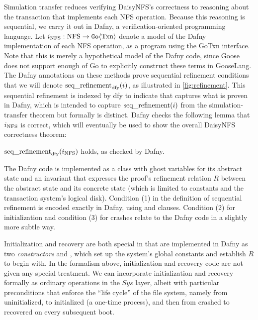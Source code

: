 \newlength{\stepw}
\newlength{\dstepw}
\newlength{\nfstop}

Simulation transfer reduces verifying DaisyNFS's correctness to reasoning about
the transaction that implements each NFS operation. Because this reasoning is
sequential, we carry it out in Dafny, a verification-oriented programming language.
Let $i_{\mathrm{NFS}} : \mathrm{NFS} \to \mathtt{Go}\langle \mathrm{Txn} \rangle$ denote a model of the
Dafny implementation of each NFS operation, as a program using the GoTxn
interface. Note that this is merely a hypothetical model of the Dafny code,
since Goose does not support enough of Go to explicitly construct these terms in
GooseLang. The Dafny annotations on these methods prove sequential refinement
conditions that we will denote $\operatorname{seq\_refinement}_{\mathrm{dfy}}(i)$, as
illustrated in \cref{fig:refinement}. This sequential refinement is indexed by
dfy to indicate that captures what is proven in Dafny, which is intended to
capture $\operatorname{seq\_refinement}(i)$ from the simulation-transfer theorem but formally is
distinct. Dafny checks the following lemma that $i_{\mathrm{NFS}}$ is correct, which will
eventually be used to show the overall DaisyNFS correctness theorem:
%
\nopagebreak
\begin{lemma} $\operatorname{seq\_refinement}_{\mathrm{dfy}}(i_{\mathrm{NFS}})$ holds, as checked by Dafny.
  \label{thm:dafny}
\end{lemma}

The Dafny code is implemented as a class with ghost variables for its abstract
state and an invariant that expresses the proof's refinement relation $R$
between the abstract state and its concrete state (which is limited to constants
and the transaction system's logical disk).  Condition (1) in the definition of
sequential refinement is encoded exactly in Dafny, using  and 
clauses. Condition (2) for initialization and condition (3) for crashes relate
to the Dafny code in a slightly more subtle way.

Initialization and recovery are both special in that are implemented in Dafny as
two \emph{constructors}  and , which set up the system's
global constants and establish $R$ to begin with. In the formalism above,
initialization and recovery code are not given any special treatment. We can
incorporate initialization and recovery formally as ordinary operations in the
$\mathit{Sys}$ layer, albeit with particular preconditions that enforce the
``life cycle'' of the file system, namely from uninitialized, to initialized (a
one-time process), and then from crashed to recovered on every subsequent boot.

